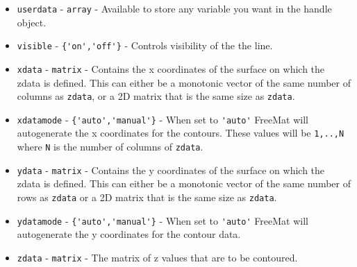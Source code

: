 \begin{itemize}
\item  \verb|userdata| - \verb|array| - Available to store any variable you
 want in the handle object.

\item  \verb|visible| - \verb|{'on','off'}| - Controls visibility of the the line.

\item  \verb|xdata| - \verb|matrix| - Contains the x coordinates of the 
 surface on which the zdata is defined.  This can either be a monotonic
 vector of the same number of columns as \verb|zdata|, or a 2D matrix
 that is the same size as \verb|zdata|.

\item  \verb|xdatamode| - \verb|{'auto','manual'}| - When set to \verb|'auto'| 
FreeMat will autogenerate the x coordinates for the contours.  
These values will be \verb|1,..,N| where \verb|N| is the number of columns
of \verb|zdata|.

\item  \verb|ydata| - \verb|matrix| - Contains the y coordinates of the
 surface on which the zdata is defined.  This can either be a monotonic
 vector of the same number of rows as \verb|zdata| or a 2D matrix that is
 the same size as \verb|zdata|.

\item  \verb|ydatamode| - \verb|{'auto','manual'}| - When set to \verb|'auto'| 
FreeMat will autogenerate the y coordinates for the contour data.

\item  \verb|zdata| - \verb|matrix| - The matrix of z values that are to
 be contoured.

\end{itemize}
